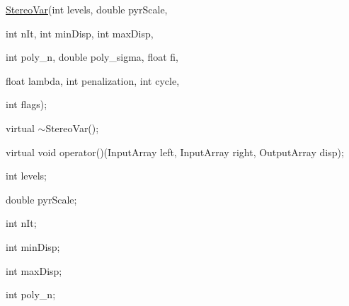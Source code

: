 {\ttfamily }

{\ttfamily }

{\ttfamily \mbox{\hyperlink{classorg_1_1opencv_1_1contrib_1_1_stereo_var}{Stereo\+Var}}(int levels, double pyr\+Scale,}

{\ttfamily }

{\ttfamily }

{\ttfamily int n\+It, int min\+Disp, int max\+Disp,}

{\ttfamily }

{\ttfamily }

{\ttfamily int poly\+\_\+n, double poly\+\_\+sigma, float fi,}

{\ttfamily }

{\ttfamily }

{\ttfamily float lambda, int penalization, int cycle,}

{\ttfamily }

{\ttfamily }

{\ttfamily int flags);}

{\ttfamily }

{\ttfamily }

{\ttfamily virtual $\sim$\+Stereo\+Var();}

{\ttfamily }

{\ttfamily }

{\ttfamily virtual void operator()(\+Input\+Array left, Input\+Array right, Output\+Array disp);}

{\ttfamily }

{\ttfamily }

{\ttfamily int levels;}

{\ttfamily }

{\ttfamily }

{\ttfamily double pyr\+Scale;}

{\ttfamily }

{\ttfamily }

{\ttfamily int n\+It;}

{\ttfamily }

{\ttfamily }

{\ttfamily int min\+Disp;}

{\ttfamily }

{\ttfamily }

{\ttfamily int max\+Disp;}

{\ttfamily }

{\ttfamily }

{\ttfamily int poly\+\_\+n;}

{\ttfamily }


